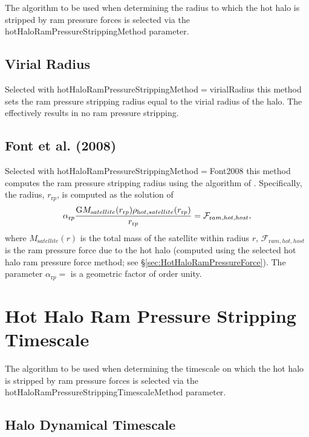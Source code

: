 The algorithm to be used when determining the radius to which the hot halo is stripped by ram pressure forces is selected via the {\normalfont \ttfamily hotHaloRamPressureStrippingMethod} parameter.

\subsection{Virial Radius}

Selected with {\normalfont \ttfamily hotHaloRamPressureStrippingMethod}$=${\normalfont \ttfamily virialRadius} this method sets the ram pressure stripping radius equal to the virial radius of the halo. The effectively results in no ram pressure stripping.

\subsection{Font et al. (2008)}

Selected with {\normalfont \ttfamily hotHaloRamPressureStrippingMethod}$=${\normalfont \ttfamily Font2008} this method computes the ram pressure stripping radius using the algorithm of \cite{font_colours_2008}. Specifically, the radius, $r_{\mathrm rp}$, is computed as the solution of
\begin{equation}
\alpha_{\mathrm rp} {{\mathrm G} M_{\mathrm satellite}(r_{\mathrm rp}) \rho_{\mathrm hot, satellite}(r_{\mathrm rp}) \over r_{\mathrm rp} } = \mathcal{F}_{\mathrm ram, hot, host},
\end{equation}
where $M_{\mathrm satellite}(r)$ is the total mass of the satellite within radius $r$, $\mathcal{F}_{\mathrm ram, hot, host}$ is the ram pressure force due to the hot halo (computed using the selected hot halo ram pressure force method; see \S\ref{sec:HotHaloRamPressureForce}). The parameter $\alpha_{\mathrm rp}=${\normalfont \ttfamily [ramPressureStrippingFormFactor]} is a geometric factor of order unity.

\section{Hot Halo Ram Pressure Stripping Timescale}

The algorithm to be used when determining the timescale on which the hot halo is stripped by ram pressure forces is selected via the {\normalfont \ttfamily hotHaloRamPressureStrippingTimescaleMethod} parameter.

\subsection{Halo Dynamical Timescale}

